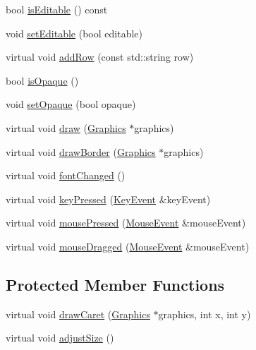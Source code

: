 \begin{DoxyCompactItemize}
bool \hyperlink{classgcn_1_1TextBox_a2cad17294e1e009c90b3c92bd1f11e5c}{is\+Editable} () const 
\item 
void \hyperlink{classgcn_1_1TextBox_a50cf82589ffe457cdf9a2e5d87545741}{set\+Editable} (bool editable)
\item 
virtual void \hyperlink{classgcn_1_1TextBox_a8d08db6568c8e74434ee2c77b1fd3fbe}{add\+Row} (const std\+::string row)
\item 
bool \hyperlink{classgcn_1_1TextBox_acf19584a872752770cd666a08a1fdba7}{is\+Opaque} ()
\item 
void \hyperlink{classgcn_1_1TextBox_a1ea6411961a6a5b0330291fb23556433}{set\+Opaque} (bool opaque)
\item 
virtual void \hyperlink{classgcn_1_1TextBox_a1954743485dad963ec5f2e12fea3afc3}{draw} (\hyperlink{classgcn_1_1Graphics}{Graphics} $\ast$graphics)
\item 
virtual void \hyperlink{classgcn_1_1TextBox_a785f4105370a44ff195a03d246df4667}{draw\+Border} (\hyperlink{classgcn_1_1Graphics}{Graphics} $\ast$graphics)
\item 
virtual void \hyperlink{classgcn_1_1TextBox_a29c1ed6c8847641ba097e2eecd957f9c}{font\+Changed} ()
\item 
virtual void \hyperlink{classgcn_1_1TextBox_aa6e7262ee31d589f8b5ce7fd7f11cf0e}{key\+Pressed} (\hyperlink{classgcn_1_1KeyEvent}{Key\+Event} \&key\+Event)
\item 
virtual void \hyperlink{classgcn_1_1TextBox_a58d4c167ff52dc9a496203880b7d791a}{mouse\+Pressed} (\hyperlink{classgcn_1_1MouseEvent}{Mouse\+Event} \&mouse\+Event)
\item 
virtual void \hyperlink{classgcn_1_1TextBox_af3a220a74e2fe29a98e817b9c0328634}{mouse\+Dragged} (\hyperlink{classgcn_1_1MouseEvent}{Mouse\+Event} \&mouse\+Event)
\end{DoxyCompactItemize}
\subsection*{Protected Member Functions}
\begin{DoxyCompactItemize}
\item 
virtual void \hyperlink{classgcn_1_1TextBox_a662b7a3429ced864bede437c671afd06}{draw\+Caret} (\hyperlink{classgcn_1_1Graphics}{Graphics} $\ast$graphics, int x, int y)
\item 
virtual void \hyperlink{classgcn_1_1TextBox_a34793e8c07259dbc67200c0a045975bc}{adjust\+Size} ()
\end{DoxyCompactItemize}
